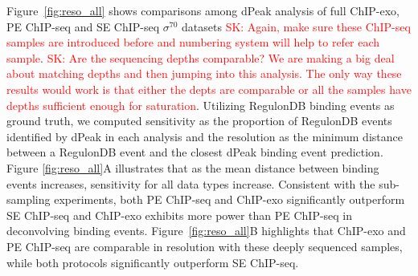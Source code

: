 \documentclass{bmcart}
\newcommand{\SK}[1]{\textcolor{red}{SK: #1}}
\newcommand{\sig}{\sigma^{70}}
\begin{document}



Figure~\ref{fig:reso_all} shows comparisons among dPeak analysis of full ChIP-exo, PE
ChIP-seq and SE ChIP-seq $\sig$ datasets \SK{Again, make sure these ChIP-seq samples are introduced before and numbering system will help to refer each sample}. \SK{Are the sequencing depths comparable? We are making a big deal about matching depths and then jumping into this analysis. The only way these results would work is that either the depts are comparable or all the samples have depths sufficient enough for saturation}. Utilizing  RegulonDB binding events as ground truth, 
we computed sensitivity  as the proportion of RegulonDB events 
identified by dPeak in each analysis and the resolution as the minimum
distance between a RegulonDB event and the closest dPeak binding
event prediction. Figure \ref{fig:reso_all}A illustrates that as the mean distance between binding events increases, sensitivity
for all data types increase. Consistent with the sub-sampling experiments, both PE ChIP-seq and ChIP-exo significantly outperform SE ChIP-seq and ChIP-exo exhibits more power than PE ChIP-seq in deconvolving binding events.
Figure~\ref{fig:reso_all}B highlights that 
ChIP-exo and PE ChIP-seq are comparable in resolution with these deeply sequenced samples, while both
protocols significantly outperform SE ChIP-seq.
\end{document}

